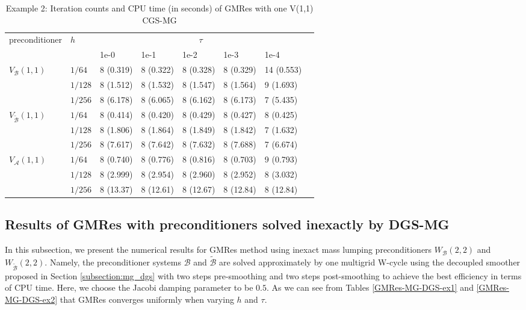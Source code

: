 \documentclass[smallcondensed]{svjour3}
\numberwithin{equation}{section} \numberwithin{table}{section}
\numberwithin{figure}{section}
\numberwithin{algorithm}{section}
\begin{document}
\begin{table}
\caption{Example 2: Iteration counts and CPU time (in seconds) of GMRes with one V(1,1) CGS-MG}
\begin{center}
\begin{tabularx}{\linewidth}{m{25mm} *7{X}}
\hline
 \multirow{2}{*}{preconditioner} & \multirow{2}{*}{$h$} &\multicolumn{5}{c}{$\tau$} \\
                          \cline{3-7}
                                        &   &1e-0&1e-1&1e-2&1e-3&1e-4\\ 
\hline
\multirow{3}{*}{$V_{\mathcal{B}}(1,1)$} & {$1/64$}  & 8 (0.319) &    8 (0.322)  &   8 (0.328)  &   8 (0.329) &   14 (0.553)\\
         					&{$1/128$} &  8 (1.512)  &   8 (1.532)  &    8 (1.547)   &   8 (1.564)   &   9 (1.693)\\
             					& {$1/256$}  & 8 (6.178)  &   8 (6.065)   &   8 (6.162)    &   8 (6.173)   &   7 (5.435)\\
\hline
\multirow{3}{*}{$V_{\tilde{\mathcal{B}}}(1,1)$} & {$1/64$}&8 (0.414) & 8 (0.420)  &   8 (0.429)  &   8 (0.427) &   8 (0.425)\\				       					&{$1/128$} & 8 (1.806)  &   8 (1.864)  &    8 (1.849)   &   8 (1.842)   &   7 (1.632)\\
						       &{$1/256$} &  8 (7.617) & 8 (7.642)   &   8 (7.632)    &   8 (7.688)   &   7 (6.674)\\
\hline
\multirow{3}{*}{$V_{\mathcal{A}}(1,1)$} & {$1/64$}& 8 (0.740) &   8 (0.776) &   8 (0.816) &  8 (0.703) &  9 (0.793)\\								         &{$1/128$} &  8 (2.999) &8 (2.954) &8 (2.960) &8 (2.952) &8 (3.032)\\
						&{$1/256$} & 8 (13.37) &8 (12.61) &8 (12.67) &8 (12.84) &8 (12.84)\\
\hline
\end{tabularx}
\end{center}
\label{GMRes-MG-Vanka-ex2}
\end{table}

 

\subsection{Results of GMRes with preconditioners solved inexactly by DGS-MG}\label{section-results-dgs-mg}
In this subsection, we present the numerical results for GMRes method using inexact mass lumping preconditioners $W_{\mathcal{B}}(2,2)$ and $W_{\tilde{\mathcal{B}}}(2,2)$. Namely, the preconditioner systems $\mathcal{B}$ and $\tilde{\mathcal{B}}$ are solved approximately by one multigrid W-cycle using the decoupled smoother proposed in Section \ref{subsection:mg_dgs} with two steps pre-smoothing and two steps post-smoothing to achieve the best efficiency in terms of CPU time. Here, we choose the Jacobi damping parameter to be $0.5$. As we can see from Tables {\ref{GMRes-MG-DGS-ex1}} and {\ref{GMRes-MG-DGS-ex2}} that GMRes converges uniformly when varying $h$ and $\tau$.
\end{document}

